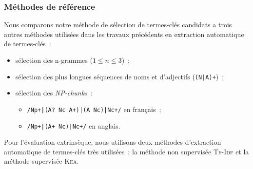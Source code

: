       \subsubsection{Méthodes de référence}
      \label{subsubsec:main-automatic_keyphrase_annotation-keyphrase_candidate_selection-evaluation-baselines}
        Nous comparons notre méthode de sélection de termes-clés candidats a
        trois autres méthodes utilisées dans les travaux précédents en
        extraction automatique de termes-clés~:
        \begin{itemize}
          \item{sélection des n-grammes ($1 \leq n \leq 3$)~;}
          \item{sélection des plus longues séquences de noms et d'adjectifs
                (\texttt{(N|A)+})~;}
          \item{sélection des \textit{NP-chunks}~:}
          \begin{itemize}
            \item{\texttt{/Np+|(A? Nc A+)|(A Nc)|Nc+/} en français~;}
            \item{\texttt{/Np+|(A+ Nc)|Nc+/} en anglais.}
          \end{itemize}
        \end{itemize}

        Pour l'évaluation extrinsèque, nous utilisons deux méthodes d'extraction
        automatique de termes-clés très utilisées~: la méthode non supervisée
        \textsc{Tf-Idf} et la méthode supervisée \textsc{Kea}. 

